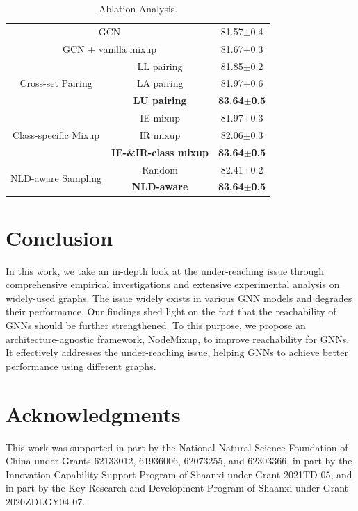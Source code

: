\documentclass[letterpaper]{article} %
\begin{document}
\begin{table}[ht!]
    \centering
    \begin{tabular}{ c c c}
    \hline
    \toprule
    \multicolumn{2}{c}{GCN} & 81.57\small{$\pm$0.4} \\
	\multicolumn{2}{c}{GCN + vanilla mixup} & 81.67\small{$\pm$0.3} \\

	\midrule
	\midrule

\multirow{3}{*}{Cross-set Pairing} & LL pairing & 81.85\small{$\pm$0.2} \\
 ~ & LA pairing & 81.97\small{$\pm$0.6} \\
 ~ & \textbf{LU pairing} & \textbf{83.64\small{$\pm$0.5}} \\

 \midrule

 \multirow{3}{*}{Class-specific Mixup} & IE mixup & 81.97\small{$\pm$0.3} \\
 ~ & IR mixup & 82.06\small{$\pm$0.3} \\
 ~ & \textbf{IE-\&IR-class mixup} & \textbf{83.64\small{$\pm$0.5}} \\

 \midrule

 \multirow{2}{*}{NLD-aware Sampling} & Random & 82.41\small{$\pm$0.2} \\
 ~ & \textbf{NLD-aware} & \textbf{83.64\small{$\pm$0.5}} \\

    \bottomrule
    \hline
    \end{tabular}
    \caption{Ablation Analysis.}
    \label{tab:ablation}
\end{table}

\section{Conclusion}
In this work, we take an in-depth look at the under-reaching issue through comprehensive empirical investigations and extensive experimental analysis on widely-used graphs. The issue widely exists in various GNN models and degrades their performance. Our findings shed light on the fact that the reachability of GNNs should be further strengthened. To this purpose, we propose an architecture-agnostic framework, NodeMixup, to improve reachability for GNNs. It effectively addresses the under-reaching issue, helping GNNs to achieve better performance using different graphs.


\section{Acknowledgments}
This work was supported in part by the National Natural Science Foundation of China under Grants 62133012, 61936006, 62073255, and 62303366, in part by the Innovation Capability Support Program of Shaanxi under Grant 2021TD-05, and in part by the Key Research and Development Program of Shaanxi under Grant 2020ZDLGY04-07.
\end{document}
